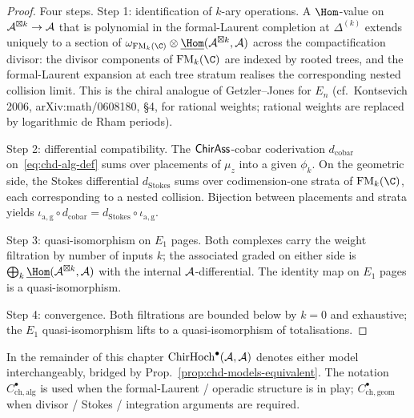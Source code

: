 \begin{proof}
Four steps. Step 1: identification of $k$-ary operations. A
$\Hom$-value on $\mathcal{A}^{\boxtimes k} \to \mathcal{A}$ that is polynomial in the
formal-Laurent completion at $\Delta^{(k)}$ extends uniquely to a
section of $\omega_{\FM_k(\C)}\otimes \underline{\Hom}(\cA^{\boxtimes k}, \cA)$
across the compactification divisor: the divisor components of
$\FM_k(\C)$ are indexed by rooted trees, and the formal-Laurent expansion at
each tree stratum realises the corresponding nested collision limit.
This is the chiral analogue of Getzler--Jones for $E_n$
(cf.~Kontsevich 2006, arXiv:math/0608180, \S4, for rational
weights; rational weights are replaced by logarithmic de Rham
periods).

Step 2: differential compatibility. The $\mathsf{ChirAss}$-cobar coderivation
$d_{\mathrm{cobar}}$ on~\eqref{eq:chd-alg-def} sums over placements of
$\mu_z$ into a given $\phi_k$. On the geometric side, the Stokes
differential $d_{\mathrm{Stokes}}$ sums over codimension-one strata of
$\FM_k(\C)$, each corresponding to a nested collision. Bijection
between placements and strata yields
$\iota_{\mathrm{a,g}}\circ d_{\mathrm{cobar}} = d_{\mathrm{Stokes}}\circ \iota_{\mathrm{a,g}}$.

Step 3: quasi-isomorphism on $E_1$ pages. Both complexes carry the
weight filtration by number of inputs $k$; the associated graded on
either side is $\bigoplus_k \underline{\Hom}(\cA^{\boxtimes k}, \cA)$
with the internal $\mathcal{A}$-differential. The identity map on $E_1$ pages
is a quasi-isomorphism.

Step 4: convergence. Both filtrations are bounded below by $k = 0$
and exhaustive; the $E_1$ quasi-isomorphism lifts to a quasi-isomorphism
of totalisations.
\end{proof}

\begin{convention}[Dealiasing]%
\label{conv:chd-dealias}%
In the remainder of this chapter $\mathrm{ChirHoch}^\bullet(\mathcal{A}, \mathcal{A})$
denotes either model interchangeably, bridged by
Prop.~\ref{prop:chd-models-equivalent}. The notation
$C^\bullet_{\mathrm{ch,alg}}$ is used when the formal-Laurent /
operadic structure is in play; $C^\bullet_{\mathrm{ch,geom}}$ when
divisor / Stokes / integration arguments are required.
\end{convention}


